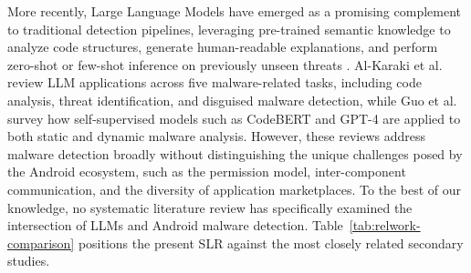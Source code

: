 More recently, Large Language Models have emerged as a promising complement to traditional detection pipelines, leveraging pre-trained semantic knowledge to analyze code structures, generate human-readable explanations, and perform zero-shot or few-shot inference on previously unseen threats \cite{alkaraki2024exploring}. Al-Karaki et al.\ \cite{alkaraki2024exploring} review LLM applications across five malware-related tasks, including code analysis, threat identification, and disguised malware detection, while Guo et al.\ \cite{guo2025} survey how self-supervised models such as CodeBERT and GPT-4 are applied to both static and dynamic malware analysis. However, these reviews address malware detection broadly without distinguishing the unique challenges posed by the Android ecosystem, such as the permission model, inter-component communication, and the diversity of application marketplaces. To the best of our knowledge, no systematic literature review has specifically examined the intersection of LLMs and Android malware detection. Table~\ref{tab:relwork-comparison} positions the present SLR against the most closely related secondary studies.

